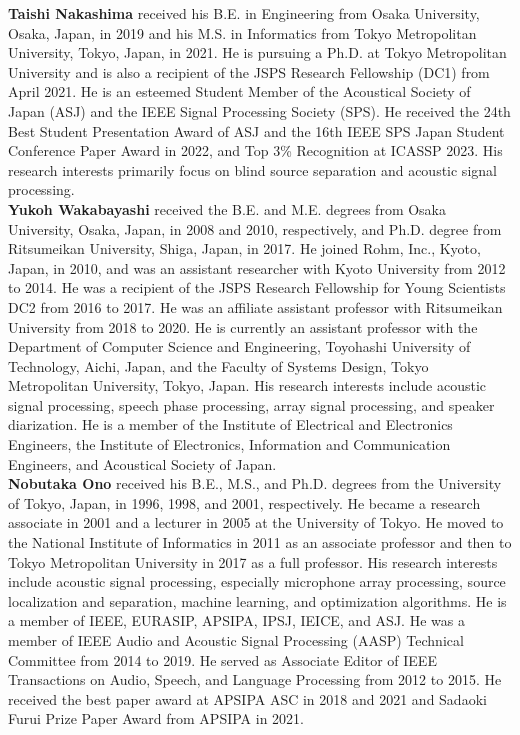 \documentclass[sip,biber]{now-journal}
\begin{document}
\noindent\normalsize\textbf{Taishi Nakashima}
received his B.E. in Engineering from Osaka University, Osaka, Japan, in 2019 and his M.S. in Informatics from Tokyo Metropolitan University, Tokyo, Japan, in 2021.
He is pursuing a Ph.D. at Tokyo Metropolitan University and is also a recipient of the JSPS Research Fellowship (DC1) from April 2021.
He is an esteemed Student Member of the Acoustical Society of Japan (ASJ) and the IEEE Signal Processing Society (SPS).
He received the 24th Best Student Presentation Award of ASJ and the 16th IEEE SPS Japan Student Conference Paper Award in 2022, and Top 3\% Recognition at ICASSP 2023.
His research interests primarily focus on blind source separation and acoustic signal processing.
\\

\noindent\normalsize\textbf{Yukoh Wakabayashi}
received the B.E. and M.E. degrees from Osaka University, Osaka, Japan, in 2008 and 2010, respectively, and Ph.D. degree from Ritsumeikan University, Shiga, Japan, in 2017.
He joined Rohm, Inc., Kyoto, Japan, in 2010, and was an assistant researcher with Kyoto University from 2012 to 2014.
He was a recipient of the JSPS Research Fellowship for Young Scientists DC2 from 2016 to 2017.
He was an affiliate assistant professor with Ritsumeikan University from 2018 to 2020.
He is currently an assistant professor with the Department of Computer Science and Engineering, Toyohashi University of Technology, Aichi, Japan, and the Faculty of Systems Design, Tokyo Metropolitan University, Tokyo, Japan.
His research interests include acoustic signal processing, speech phase processing, array signal processing, and speaker diarization.
He is a member of the Institute of Electrical and Electronics Engineers, the Institute of Electronics, Information and Communication Engineers, and Acoustical Society of Japan.
\\

\noindent\normalsize\textbf{Nobutaka Ono}
received his B.E., M.S., and Ph.D. degrees from the University of Tokyo, Japan, in 1996, 1998, and 2001, respectively.
He became a research associate in 2001 and a lecturer in 2005 at the University of Tokyo.
He moved to the National Institute of Informatics in 2011 as an associate professor and then to Tokyo Metropolitan University in 2017 as a full professor.
His research interests include acoustic signal processing, especially microphone array processing, source localization and separation, machine learning, and optimization algorithms.
He is a member of IEEE, EURASIP, APSIPA, IPSJ, IEICE, and ASJ.
He was a member of IEEE Audio and Acoustic Signal Processing (AASP) Technical Committee from 2014 to 2019.
He served as Associate Editor of IEEE Transactions on Audio, Speech, and Language Processing from 2012 to 2015.
He received the best paper award at APSIPA ASC in 2018 and 2021 and Sadaoki Furui Prize Paper Award from APSIPA in 2021.

\printbibliography
\end{document}
